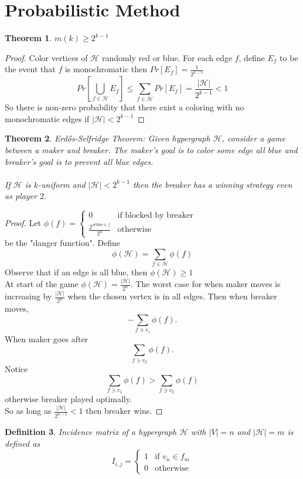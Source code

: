 \documentclass[a4paper]{article}
\newtheorem{thm}{Theorem}[section]
\newtheorem{defn}[thm]{Definition}
\begin{document}
\section{Probabilistic Method}
\begin{thm}
    $m(k)\geq2^{k-1}$
\end{thm}
\begin{proof}
    Color vertices of $\mathcal{H}$ randomly red or blue. For each edge $f$, define $E_f$ to be the event that $f$ is monochromatic then $Pr[E_f]=\frac{1}{2^{k-1}}$
    $$Pr\left [\bigcup_{f\in \mathcal{H}}E_f \right ]\leq  \sum_{f\in \mathcal{H}}Pr\left [E_f \right ]=\frac{|\mathcal{H}|}{2^{k-1}}<1$$ 
    So there is non-zero probability that there exist a coloring with no monochromatic edges if $|\mathcal{H}|<2^{k-1}$
\end{proof}
\begin{thm} 
    Erdős-Selfridge Theorem:
    Given hypergraph $\mathcal{H}$, consider a game between a maker and breaker. The maker's goal is to color some edge all blue and breaker's goal is to prevent all blue edges. \\\\
    If $\mathcal{H}$ is $k$-uniform and $|\mathcal{H}|<2^{k-1}$ then the breaker has a winning strategy even as player $2.$
\end{thm}
\begin{proof}
    Let $\phi(f)=\begin{cases}
        0 & \text{if blocked by breaker}\\
        \frac{2^{\text{\#blue}\in f}}{2^n} & \text{otherwise} 
    \end{cases}$\\
    be the "danger function". Define $$\phi(\mathcal{H})=\sum_{f\in \mathcal{H}}\phi(f)$$
    Observe that if an edge is all blue, then $\phi(\mathcal{H})\geq 1$\\
    At start of the game $\phi(\mathcal{H})=\frac{|\mathcal{H}|}{2^n}.$ The worst case for when maker moves is increasing by $\frac{|\mathcal{H}|}{2^n}$ when the chosen vertex is in all edges. Then when breaker moves, $$-\sum_{f \ni v_1}\phi (f).$$
    When maker goes after $$\sum_{f \ni v_2}\phi (f).$$
    Notice $$\sum_{f \ni v_1}\phi (f)>\sum_{f \ni v_2}\phi (f)$$ otherwise breaker played optimally. \\
    So as long as $\frac{|\mathcal{H}|}{2^{n-1}}<1$ then breaker wins.
\end{proof}
\begin{defn}
    Incidence matrix of a hypergraph $\mathcal{H}$ with $|V|=n$ and $|\mathcal{H}|=m$ is defined as $$I_{i,j}=\begin{cases}
        1 & \text{if } v_n\in f_m \\ 0 & \text{otherwise}
    \end{cases}$$
\end{defn}
\end{document}
